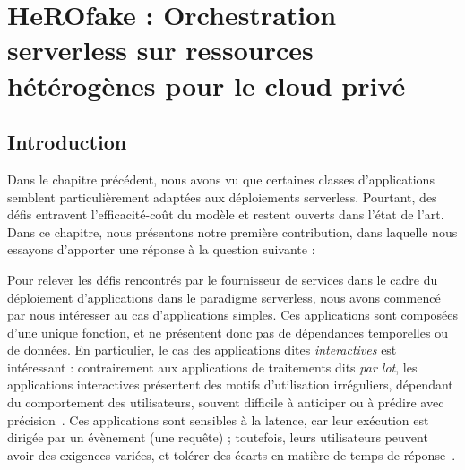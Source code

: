 \chapter{HeROfake : Orchestration serverless sur ressources hétérogènes pour le cloud privé}
\label{chapter:herofake}



\section{Introduction}
\label{section:herofake-introduction}

Dans le chapitre précédent, nous avons vu que certaines classes d'applications semblent particulièrement adaptées aux déploiements serverless. Pourtant, des défis entravent l'efficacité-coût du modèle et restent ouverts dans l'état de l'art. Dans ce chapitre, nous présentons notre première contribution, dans laquelle nous essayons d'apporter une réponse à la question suivante : 


Pour relever les défis rencontrés par le fournisseur de services dans le cadre du déploiement d'applications dans le paradigme serverless, nous avons commencé par nous intéresser au cas d'applications simples. Ces applications sont composées d'une unique fonction, et ne présentent donc pas de dépendances temporelles ou de données. En particulier, le cas des applications dites \textit{interactives} est intéressant : contrairement aux applications de traitements dits \textit{par lot}, les applications interactives présentent des motifs d'utilisation irréguliers, dépendant du comportement des utilisateurs, souvent difficile à anticiper ou à prédire avec précision~\cite{shahradServerlessWildCharacterizing, cncf2018whitepaper}. Ces applications sont sensibles à la latence, car leur exécution est dirigée par un évènement (une requête) ; toutefois, leurs utilisateurs peuvent avoir des exigences variées, et tolérer des écarts en matière de temps de réponse~\cite{buyyaSLAorientedResourceProvisioning2011}.

